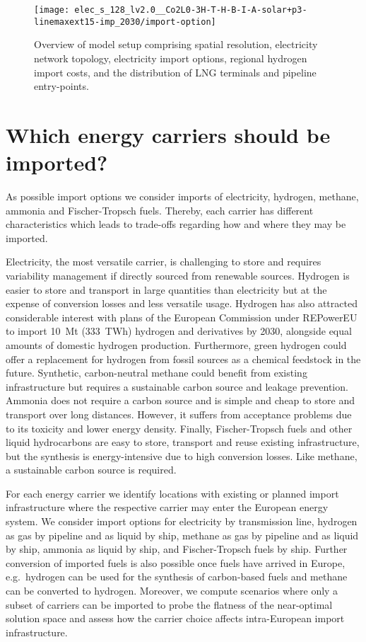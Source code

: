 \documentclass[10pt,5p,reversenotenum,lefttitle]{elsarticle}
\begin{document}
\begin{figure*}[ht]
    \centering
    \texttt{[image: elec\_s\_128\_lv2.0\_\_Co2L0-3H-T-H-B-I-A-solar+p3-linemaxext15-imp\_2030/import-option]}
    \caption{Overview of model setup comprising spatial resolution, electricity network topology, electricity import options, regional hydrogen import costs, and the distribution of LNG terminals and pipeline entry-points.}
    \label{fig:import-option}
\end{figure*}

\section*{Which energy carriers should be imported?}

As possible import options we consider imports of electricity, hydrogen,
methane, ammonia and Fischer-Tropsch fuels. Thereby, each carrier has different
characteristics which leads to trade-offs regarding how and where they may be
imported.

Electricity, the most versatile carrier, is challenging to store and requires
variability management if directly sourced from renewable sources. Hydrogen is
easier to store and transport in large quantities than electricity but at the
expense of conversion losses and less versatile usage. Hydrogen has also
attracted considerable interest with plans of the European Commission under
\mbox{REPowerEU}\cite{europeancommissionRepowerEUPlan} to import 10~Mt (333~TWh)
hydrogen and derivatives by 2030, alongside equal amounts of domestic hydrogen
production. Furthermore, green hydrogen could offer a replacement for hydrogen
from fossil sources as a chemical feedstock in the future. Synthetic,
carbon-neutral methane could benefit from existing infrastructure but requires a
sustainable carbon source and leakage prevention. Ammonia does not require a
carbon source and is simple and cheap to store and transport over long
distances. However, it suffers from acceptance problems due to its toxicity and
lower energy density. Finally, Fischer-Tropsch fuels and other liquid
hydrocarbons are easy to store, transport and reuse existing infrastructure, but
the synthesis is energy-intensive due to high conversion losses. Like methane, a
sustainable carbon source is required.

For each energy carrier we identify locations with existing or planned import
infrastructure where the respective carrier may enter the European energy
system. We consider import options for electricity by transmission line,
hydrogen as gas by pipeline and as liquid by ship, methane as gas by pipeline
and as liquid by ship, ammonia as liquid by ship, and Fischer-Tropsch fuels by
ship. Further conversion of imported fuels is also possible once fuels have
arrived in Europe, e.g.~hydrogen can be used for the synthesis of carbon-based
fuels and methane can be converted to hydrogen. Moreover, we compute scenarios
where only a subset of carriers can be imported to probe the flatness of the
near-optimal solution space and assess how the carrier choice affects
intra-European import infrastructure.
\end{document}
